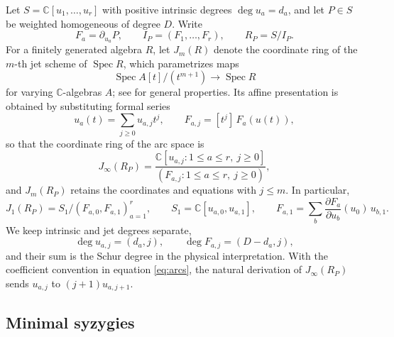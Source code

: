 \documentclass[10pt,reqno]{amsart}
\numberwithin{equation}{section}
\theoremstyle{plain}
\theoremstyle{definition}
\DeclareMathOperator{\Spec}{Spec}
\begin{document}
Let $S=\mathbb{C}[u_1,\dots,u_r]$ with positive intrinsic degrees $\deg u_a=d_a$, and let $P\in S$ be weighted homogeneous of degree $D$. Write
\begin{equation*}
	F_a=\partial_{u_a}P,\qquad I_P=(F_1,\dots,F_r),\qquad R_P=S/I_P.
\end{equation*}
For a finitely generated algebra $R$, let $J_m(R)$ denote the coordinate ring of the $m$-th jet scheme of $\Spec R$, which parametrizes maps 
\begin{equation*}
    \Spec A[t]/(t^{m+1})\to\Spec R
\end{equation*}
for varying $\mathbb{C}$-algebras $A$; see \cite{Mustata,EM} for general properties. Its affine presentation is obtained by substituting formal series
\begin{equation}\label{eq:arcs}
	u_a(t)=\sum_{j\ge0}u_{a,j}t^j,\qquad F_{a,j}=[t^j]\,F_a(u(t)),
\end{equation}
so that the coordinate ring of the arc space is
\begin{equation*}
	J_\infty(R_P)=\frac{\mathbb{C}[u_{a,j}:1\le a\le r,\ j\ge0]}{(F_{a,j}:1\le a\le r,\ j\ge0)},
\end{equation*}
and $J_m(R_P)$ retains the coordinates and equations with $j\le m$. In particular,
\begin{equation*}
	J_1(R_P)=S_1/(F_{a,0},F_{a,1})_{a=1}^r,\qquad S_1=\mathbb{C}[u_{a,0},u_{a,1}],\qquad
	F_{a,1}=\sum_b\frac{\partial F_a}{\partial u_b}(u_0)\,u_{b,1}.
\end{equation*}
We keep intrinsic and jet degrees separate,
\begin{equation*}
	\deg u_{a,j}=(d_a,j),\qquad \deg F_{a,j}=(D-d_a,j),
\end{equation*}
and their sum is the Schur degree in the physical interpretation. With the coefficient convention in equation \eqref{eq:arcs}, the natural derivation of $J_\infty(R_P)$ sends $u_{a,j}$ to $(j+1)u_{a,j+1}$.

\subsection{Minimal syzygies}
\end{document}
